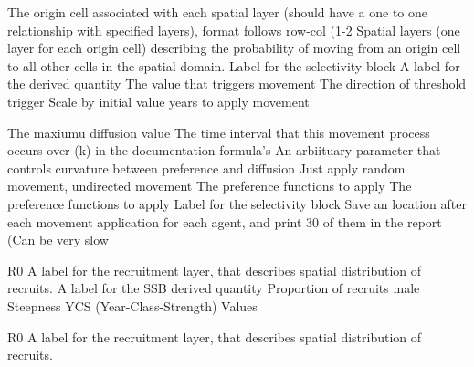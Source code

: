 \par\textbf{}\par
{} {The origin cell associated with each spatial layer (should have a one to one relationship with specified layers), format follows row-col (1-2}
 {Spatial layers (one layer for each origin cell) describing the probability of moving from an origin cell to all other cells in the spatial domain.}
 {Label for the selectivity block}
 {A label for the derived quantity}
 {The value that triggers movement}
 {The direction of threshold trigger}
 {Scale by initial value}
 {years to apply movement}
\par\textbf{}\par
{} {The maxiumu diffusion value}
 {The time interval that this movement process occurs over (k) in the documentation formula's}
 {An arbiituary parameter that controls curvature between preference and diffusion}
 {Just apply random movement, undirected movement}
 {The preference functions to apply}
 {The preference functions to apply}
 {Label for the selectivity block}
 {Save an location after each movement application for each agent, and print 30 of them in the report (Can be very slow}
\par\textbf{}\par
\par\textbf{}\par
{} {R0}
 {A label for the recruitment layer, that describes spatial distribution of recruits.}
 {A label for the SSB derived quantity}
 {Proportion of recruits male}
 {}
 {}
 {Steepness}
 {YCS (Year-Class-Strength) Values}
\par\textbf{}\par
{} {R0}
 {A label for the recruitment layer, that describes spatial distribution of recruits.}
